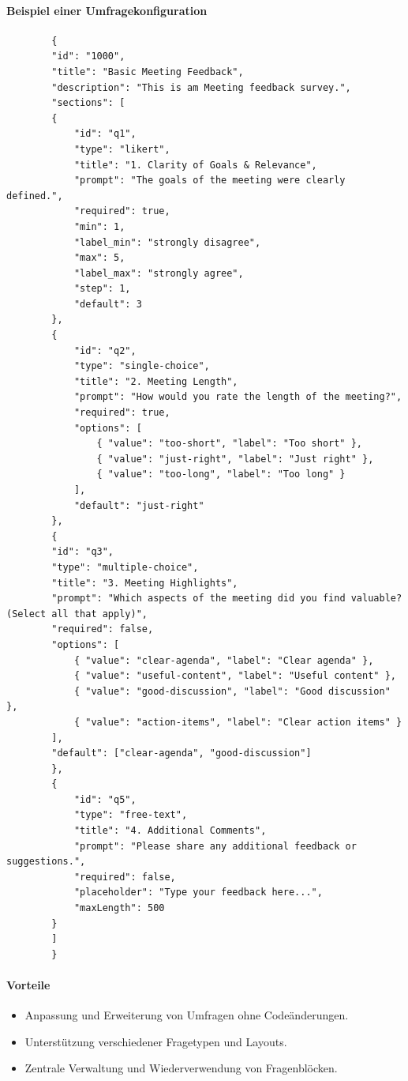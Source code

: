 \documentclass[12pt,a4paper]{report}
\begin{document}
\paragraph{Beispiel einer Umfragekonfiguration}
    \begin{verbatim}
        {
        "id": "1000",
        "title": "Basic Meeting Feedback",
        "description": "This is am Meeting feedback survey.",
        "sections": [
        {
            "id": "q1",
            "type": "likert",
            "title": "1. Clarity of Goals & Relevance",
            "prompt": "The goals of the meeting were clearly defined.",
            "required": true,
            "min": 1,
            "label_min": "strongly disagree",
            "max": 5,
            "label_max": "strongly agree",
            "step": 1,
            "default": 3
        },
        {
            "id": "q2",
            "type": "single-choice",
            "title": "2. Meeting Length",
            "prompt": "How would you rate the length of the meeting?",
            "required": true,
            "options": [
                { "value": "too-short", "label": "Too short" },
                { "value": "just-right", "label": "Just right" },
                { "value": "too-long", "label": "Too long" }
            ],
            "default": "just-right"
        },
        {
        "id": "q3",
        "type": "multiple-choice",
        "title": "3. Meeting Highlights",
        "prompt": "Which aspects of the meeting did you find valuable? (Select all that apply)",
        "required": false,
        "options": [
            { "value": "clear-agenda", "label": "Clear agenda" },
            { "value": "useful-content", "label": "Useful content" },
            { "value": "good-discussion", "label": "Good discussion" },
            { "value": "action-items", "label": "Clear action items" }
        ],
        "default": ["clear-agenda", "good-discussion"]
        },
        {
            "id": "q5",
            "type": "free-text",
            "title": "4. Additional Comments",
            "prompt": "Please share any additional feedback or suggestions.",
            "required": false,
            "placeholder": "Type your feedback here...",
            "maxLength": 500
        }
        ]
        }
    \end{verbatim}

\paragraph{Vorteile}
    \begin{itemize}
        \item Anpassung und Erweiterung von Umfragen ohne Codeänderungen.
        \item Unterstützung verschiedener Fragetypen und Layouts.
        \item Zentrale Verwaltung und Wiederverwendung von Fragenblöcken.
    \end{itemize}
\end{document}
